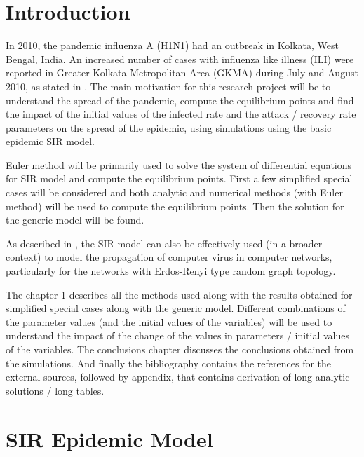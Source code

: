 \documentclass[11pt, a4paper, twoside]{report}
\begin{document}

\chapter{Introduction} %
In 2010, the pandemic influenza A (H1N1) had an outbreak in Kolkata, West Bengal, India. An increased number of cases with influenza like illness (ILI) were reported in Greater Kolkata Metropolitan Area (GKMA) during July and August 2010, as stated in \cite{bib:ijmr}. The main motivation for this research project will be to understand the spread of the pandemic, compute the equilibrium points and find the impact of the initial values of the infected rate and the attack / recovery rate parameters on the spread of the epidemic, using simulations using the basic epidemic SIR model.

Euler method will be primarily used to solve the system of differential equations for SIR model and compute the equilibrium points. First a few simplified special cases will be considered and both analytic and numerical methods (with Euler method) will be used to compute the equilibrium points. Then the solution for the generic model will be found. 

As described in \cite{bib:virus}, the SIR model can also be effectively used (in a broader context) to model the propagation of computer virus in computer networks, particularly for the networks with Erdos-Renyi type random graph topology.

The chapter 1 describes all the methods used along with the results obtained for simplified special cases along with the generic model. Different combinations of the parameter values (and the initial values of the variables) will be used to understand the impact of the change of the values in parameters / initial values of the variables. The conclusions chapter discusses the conclusions obtained from the simulations. And finally the bibliography contains the references for the external sources, followed by appendix, that contains derivation of long analytic solutions / long tables.



\chapter{SIR Epidemic Model}
\end{document}
